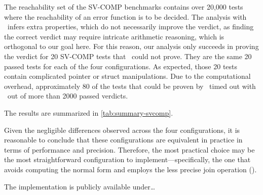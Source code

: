 The reachability set of the SV-COMP benchmarks contains over 20,000 tests where the reachability of an error function is to be decided.
The analysis with \cpo\ infers extra properties, which do not necessarily improve the verdict,
as finding the correct verdict may require intricate arithmetic reasoning, which is orthogonal to our goal here.
For this reason, our analysis only succeeds in proving the verdict for 20 SV-COMP tests that \base\ could not prove.
They are the same 20 passed tests for each of the four configurations.
As expected, those 20 tests contain complicated pointer or struct manipulations.
Due to the computational overhead, approximately 80 of the tests that could be proven by \base\ timed out with \cpo\ out of more than 2000 passed verdicts.

The results are summarized in \cref{tab:summary-svcomp}.

Given the negligible differences observed across the four configurations, it is reasonable to conclude that these configurations are equivalent in practice in terms of performance and precision.
Therefore, the most practical choice may be the most straightforward configuration to implement---specifically, the one that avoids computing the normal form and employs the less precise join operation (\cpoq).

The implementation is publicly available under\dots {}
